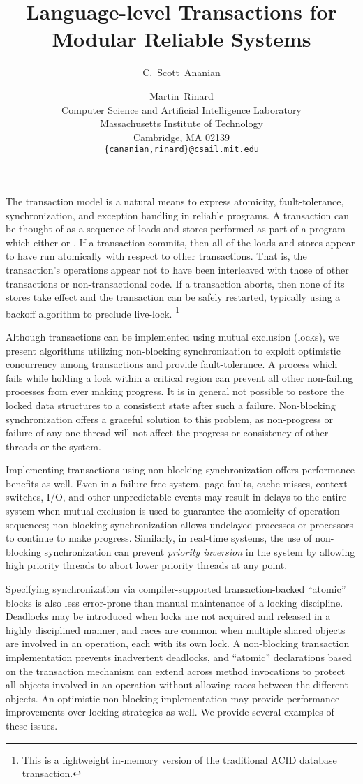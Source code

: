 \documentclass[twoside,twocolumn,notitlepage,letterpaper]{article}
\title{Language-level Transactions for Modular Reliable Systems}
\author{C.~Scott~Ananian \and Martin~Rinard \\
Computer Science and Artificial Intelligence Laboratory\\
Massachusetts Institute of Technology\\ 
Cambridge, MA 02139 \\
\texttt{\{cananian,rinard\}@csail.mit.edu}
}
\date{}
\begin{document}
\maketitle
{}

The transaction model is a natural means to express atomicity,
fault-tolerance, synchronization, and exception handling in reliable
programs.  A transaction can be thought of as a sequence of loads and
stores performed as part of a program which either  or
.  If a transaction commits, then all of the loads and
stores appear to have run atomically with respect to other
transactions.  That is, the transaction's operations appear not to
have been interleaved with those of other transactions or
non-transactional code.  If a transaction aborts, then none of its
stores take effect and the transaction can be safely restarted,
typically using a backoff algorithm to preclude live-lock.%
\footnote{This is a lightweight in-memory version of the traditional
  ACID database transaction.}

Although transactions can be implemented using mutual exclusion
(locks), we present algorithms utilizing non-blocking synchronization
to exploit optimistic concurrency among transactions and provide
fault-tolerance.  A process which fails while holding a lock within a
critical region can prevent all other non-failing processes from ever
making progress.  It is in general not possible to restore the locked
data structures to a consistent state after such a failure.
Non-blocking synchronization offers a graceful solution to this
problem, as non-progress or failure of any one thread will not affect
the progress or consistency of other threads or the system.

Implementing transactions using non-blocking synchronization offers
performance benefits as well.  Even in a failure-free system, page
faults, cache misses, context switches, I/O, and other unpredictable
events may result in delays to the entire system when mutual exclusion
is used to guarantee the atomicity of operation sequences;
non-blocking synchronization allows undelayed processes or processors
to continue to make progress.  Similarly, in real-time systems, the
use of non-blocking synchronization can prevent \emph{priority
  inversion} in the system by allowing high priority threads to abort
lower priority threads at any point.

Specifying synchronization via compiler-supported transaction-backed
``atomic'' blocks is also less error-prone than manual maintenance of
a locking discipline.  Deadlocks may be introduced when locks are not
acquired and released in a highly disciplined manner, and races are
common when multiple shared objects are involved in an operation, each
with its own lock.  A non-blocking transaction implementation prevents
inadvertent deadlocks, and ``atomic'' declarations based on the
transaction mechanism can extend across method invocations to protect
all objects involved in an operation without allowing races between
the different objects.  An optimistic non-blocking implementation may
provide performance improvements over locking strategies as well.
We provide several examples of these issues.
\end{document}
